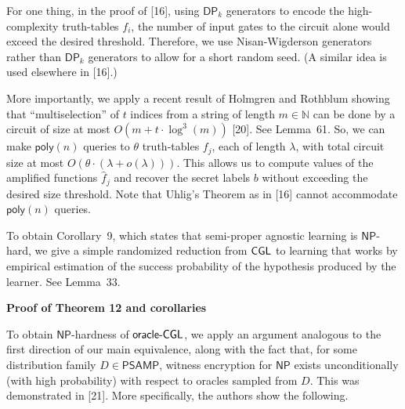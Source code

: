 For one thing, in the proof of [16], using ${\mathsf{DP}}_{k}$ generators to encode the high-complexity truth-tables $f_{i}$, the number of input gates to the circuit alone would exceed the desired threshold. Therefore, we use Nisan-Wigderson generators rather than ${\mathsf{DP}}_{k}$ generators to allow for a short random seed. (A similar idea is used elsewhere in [16].)\par




More importantly, we apply a recent result of Holmgren and Rothblum showing that “multiselection” of $t$ indices from a string of length $m\in\mathbb{N}$ can be done by a circuit of size at most $O(m+t\cdot\log^{3}(m))$ [20]. See Lemma 61. So, we can make ${\mathsf{poly}}(n)$ queries to $\theta$ truth-tables $f_{j}$, each of length $\lambda$, with total circuit size at most $O(\theta\cdot(\lambda+o(\lambda)))$. This allows us to compute values of the amplified functions $\hat{f}_{j}$ and recover the secret labels $b$ without exceeding the desired size threshold. Note that Uhlig’s Theorem as in [16] cannot accommodate ${\mathsf{poly}}(n)$ queries.\par




To obtain Corollary 9, which states that semi-proper agnostic learning is ${\mathsf{NP}}$-hard, we give a simple randomized reduction from ${\sf CGL}$ to learning that works by empirical estimation of the success probability of the hypothesis produced by the learner. See Lemma 33.\par





\par\medskip\noindent\textbf{Proof of Theorem 12 and corollaries}\par




To obtain ${\mathsf{NP}}$-hardness of ${\sf oracle}\text{-}{\sf CGL}$, we apply an argument analogous to the first direction of our main equivalence, along with the fact that, for some distribution family $D\in{\mathsf{P}}{\mathsf{SAMP}}$, witness encryption for ${\mathsf{NP}}$ exists unconditionally (with high probability) with respect to oracles sampled from $D$. This was demonstrated in [21]. More specifically, the authors show the following.\par






